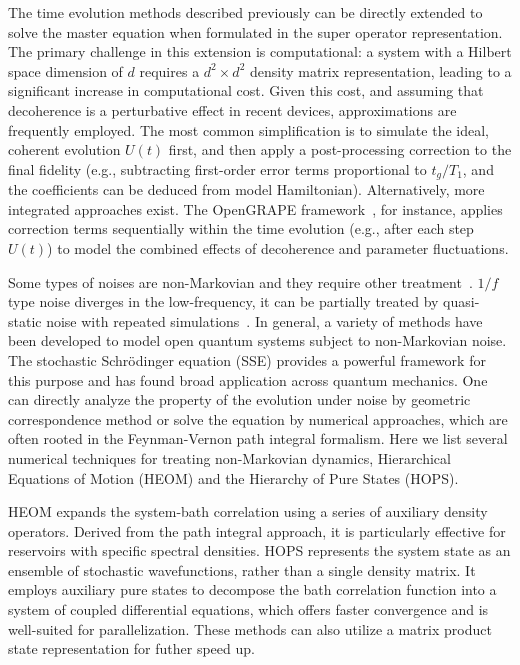 \documentclass[a4paper,onecolumn,11pt,unpublished]{quantumarticle}
\begin{document}
The time evolution methods described previously can be directly extended to solve the master equation when formulated in the super operator representation. The primary challenge in this extension is computational: a system with a Hilbert space dimension of $d$ requires a $d^2 \times d^2$ density matrix representation, leading to a significant increase in computational cost. Given this cost, and assuming that decoherence is a perturbative effect in recent devices, approximations are frequently employed. The most common simplification is to simulate the ideal, coherent evolution $U(t)$ first, and then apply a post-processing correction to the final fidelity (e.g., subtracting first-order error terms proportional to $t_g/T_1$, and the coefficients can be deduced from model Hamiltonian). Alternatively, more integrated approaches exist. The OpenGRAPE framework~\cite{Chen2025Robust}, for instance, applies correction terms sequentially within the time evolution (e.g., after each step $U(t)$) to model the combined effects of decoherence and parameter fluctuations.

Some types of noises are non-Markovian and they require other treatment~\cite{Keeling2025processTensorNonMarkovian}. $1/f$ type noise diverges in the low-frequency, it can be partially treated by quasi-static noise with repeated simulations~\cite{OBrien2017Densitymatrix,Rol2019Fast}. In general, a variety of methods have been developed to model open quantum systems subject to non-Markovian noise. The stochastic Schr\"odinger equation (SSE) provides a powerful framework for this purpose and has found broad application across quantum mechanics\cite{Diosi1997The,Diosi1998NonMarkovian,Strunz1999Open}. One can directly analyze the property of the evolution under noise by geometric correspondence method\cite{Hai2025Geometric} or solve the equation by numerical approaches, which are often rooted in the Feynman-Vernon path integral formalism\cite{Feynman1963The,Caldeira1983Path}. Here we list several numerical techniques for treating non-Markovian dynamics, Hierarchical Equations of Motion (HEOM) and the Hierarchy of Pure States (HOPS). 

HEOM expands the system-bath correlation using a series of auxiliary density operators. Derived from the path integral approach, it is particularly effective for reservoirs with specific spectral densities\cite{Tanimura1989Time,Tanimura2020Numerically,Xu2022Taming,Nakamura2025Entanglement,Chen2025Simulation}. HOPS represents the system state as an ensemble of stochastic wavefunctions, rather than a single density matrix. It employs auxiliary pure states to decompose the bath correlation function into a system of coupled differential equations, which offers faster convergence and is well-suited for parallelization\cite{Suess2014Hierarchy,Suess2015Hierarchical}. These methods can also utilize a matrix product state representation for futher speed up\cite{Gao2022NonMarkovian}.
\end{document}
